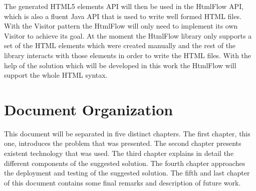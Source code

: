 \noindent
The generated HTML5 elements API will then be used in the HtmlFlow API, which is also a fluent Java API that is used to write well formed HTML files. With the Visitor pattern the HtmlFlow will only need to implement its own Visitor to achieve its goal. At the moment the HtmlFlow library only supports a set of the HTML elements which were created manually and the rest of the library interacts with those elements in order to write the HTML files. With the help of the solution which will be developed in this work the HtmlFlow will support the whole HTML syntax. 

\newpage

\section{Document Organization}

This document will be separated in five distinct chapters. The first chapter, this one, introduces the problem that was presented. The second chapter presents existent technology that was used. The third chapter explains in detail the different components of the suggested solution. The fourth chapter approaches the deployment and testing of the suggested solution. The fifth and last chapter of this document contains some final remarks and description of future work.